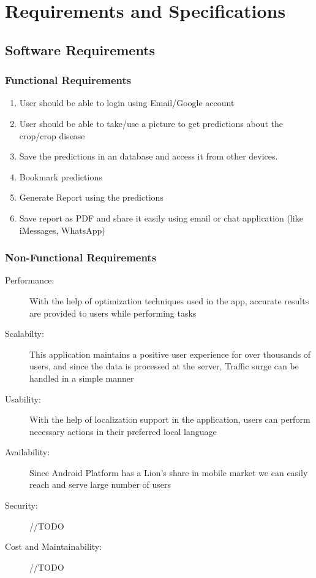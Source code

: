 \documentclass[../Report.tex]{subfiles}
\begin{document}
\chapter{Requirements and  Specifications}

\section{Software Requirements}

\subsection{Functional Requirements}

\begin{enumerate}
  \item User should be able to login using Email/Google account
  
  \item User should be able to take/use a picture to get predictions about the crop/crop disease
  
  \item Save the predictions in an database and access it from other devices.
  
  \item Bookmark predictions
  
  \item Generate Report using the predictions
  
  \item Save report as PDF and share it easily using email or chat application (like iMessages, WhatsApp)

\end{enumerate}

\subsection{Non-Functional Requirements}
\begin{description}
  \item[Performance: ] With the help of optimization techniques used in the app, accurate results are provided to users while performing tasks
  
  \item[Scalabilty: ] This application maintains a positive user experience for over thousands of users, and since the data is processed
at the server, Traffic surge can be handled in a simple manner

  \item[Usability: ] With the help of localization support in the application, users can perform necessary actions in their preferred local language

  \item[Availability: ] Since Android Platform has a Lion's share in mobile market we can easily reach and serve large number of users

  \item[Security: ] //TODO

  \item[Cost and Maintainability: ] //TODO
\end{description} 
\end{document}
